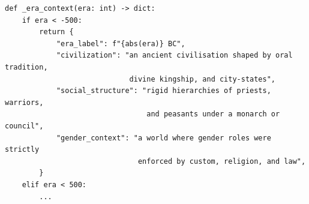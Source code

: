\documentclass[11pt, a4paper]{report}
\begin{document}
\begin{lstlisting}[caption={Era contextualisation function (reconstructor.py, excerpt)}, label={lst:eracontext}]
def _era_context(era: int) -> dict:
    if era < -500:
        return {
            "era_label": f"{abs(era)} BC",
            "civilization": "an ancient civilisation shaped by oral tradition,
                             divine kingship, and city-states",
            "social_structure": "rigid hierarchies of priests, warriors,
                                 and peasants under a monarch or council",
            "gender_context": "a world where gender roles were strictly
                               enforced by custom, religion, and law",
        }
    elif era < 500:
        ...
\end{lstlisting}
\end{document}
